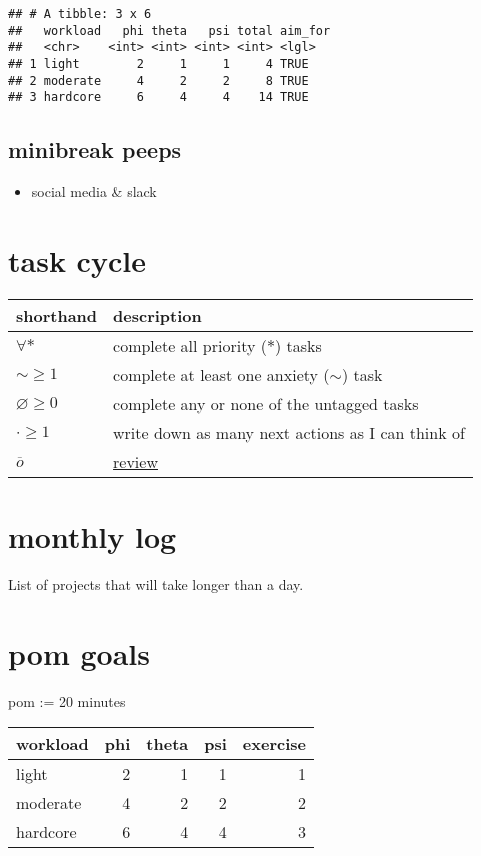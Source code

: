 \documentclass[]{book}
\providecommand{\tightlist}{%
  \setlength{\itemsep}{0pt}\setlength{\parskip}{0pt}}
\begin{document}
\begin{verbatim}
## # A tibble: 3 x 6
##   workload   phi theta   psi total aim_for
##   <chr>    <int> <int> <int> <int> <lgl>  
## 1 light        2     1     1     4 TRUE   
## 2 moderate     4     2     2     8 TRUE   
## 3 hardcore     6     4     4    14 TRUE
\end{verbatim}

\hypertarget{minibreak-peeps}{%
\subsection{minibreak peeps}\label{minibreak-peeps}}

\begin{itemize}
\tightlist
\item
  social media \& slack
\end{itemize}

\hypertarget{task-cycle}{%
\section{task cycle}\label{task-cycle}}

\begin{longtable}[]{@{}ll@{}}
\toprule
shorthand & description\tabularnewline
\midrule
\endhead
\(\forall *\) & complete all priority (\(*\)) tasks\tabularnewline
\(\sim \geqslant 1\) & complete at least one anxiety (\(\sim\)) task\tabularnewline
\(\varnothing \geqslant 0\) & complete any or none of the untagged tasks\tabularnewline
\(\cdot \geqslant 1\) & write down as many next actions as I can think of\tabularnewline
\(\overline o\) & \protect\hyperlink{review}{review}\tabularnewline
\bottomrule
\end{longtable}

\hypertarget{monthly-log}{%
\section{monthly log}\label{monthly-log}}

List of projects that will take longer than a day.

\hypertarget{pom-goals}{%
\section{pom goals}\label{pom-goals}}

pom := 20 minutes

\begin{tabular}{l|r|r|r|r}
\hline
workload & phi & theta & psi & exercise\\
\hline
light & 2 & 1 & 1 & 1\\
\hline
moderate & 4 & 2 & 2 & 2\\
\hline
hardcore & 6 & 4 & 4 & 3\\
\hline
\end{tabular}
\end{document}
